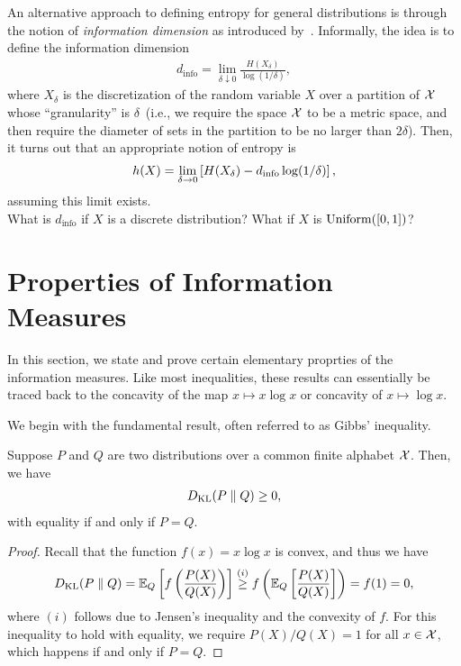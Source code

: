 \documentclass[12pt]{article}
\begin{document}
\begin{remark}
\label{remark:general-entropy} An alternative approach to defining entropy for general distributions is through the notion of \emph{information dimension} as introduced by~\citet{renyi1959dimension}. Informally, the idea is to define the information dimension 
\begin{align}
d_{\text{info}} = \lim_{\delta \downarrow 0} \frac{H(X_\delta)}{\log(1/\delta)}, 
\end{align}
where $X_\delta$ is the discretization of the random variable $X$ over a partition of ${\cal X}$ whose ``granularity'' is $\delta$~(i.e., we require the space ${\cal X}$ to be a metric space, and then require the diameter of sets in the partition to be no larger than $2\delta$). Then, it turns out that an appropriate notion of entropy is 
\begin{align}
h(X) = \lim_{\delta \to 0} \left[ H(X_\delta) - d_{\text{info}} \log(1/\delta) \right], 
\end{align}
assuming this limit exists. \\
 What is $d_{\text{info}}$ if $X$ is a discrete distribution? What if $X$ is $\mathrm{Uniform}([0,1])$? 
\end{remark}

\section{Properties of Information Measures}
\label{sec:properties-of-information-measures}
In this section, we state and prove certain elementary proprties of the information measures. Like most inequalities, these results can essentially be traced back to the concavity of the map $x \mapsto x \log x$ or concavity of $x \mapsto \log x$. 

We begin with the fundamental result, often referred to as Gibbs' inequality. 
\begin{theorem}
\label{theorem:gibbs} Suppose $P$ and $Q$ are two distributions over a common finite alphabet ${\cal X}$. Then, we have 
\begin{align}
D_{\text{KL}}(P \parallel Q) \geq 0, 
\end{align}
with equality if and only if $P=Q$. 
\end{theorem}

\begin{proof}
Recall that the function $f(x) = x \log x$ is convex, and thus we have 
\begin{align}
D_{\text{KL}}(P\parallel Q) = \mathbb{E}_{Q}\left[ f\left( \frac{P(X)}{Q(X)} \right) \right] \stackrel{(i)}{\geq} f\left( \mathbb{E}_Q\left[ \frac{P(X)}{Q(X)} \right] \right) = f(1) = 0, 
\end{align}
where $(i)$ follows due to Jensen's inequality and the convexity of $f$. For this inequality to hold with equality, we require $P(X)/Q(X)=1$ for all $x \in {\cal X}$, which happens if and only if $P=Q$. 
\end{proof}
\end{document}
